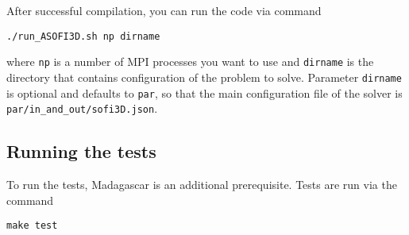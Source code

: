 After successful compilation, you can run the code via command

\begin{verbatim}
./run_ASOFI3D.sh np dirname
\end{verbatim}

where \texttt{np} is a number of MPI processes you want to use and
\texttt{dirname} is the directory that contains configuration of the
problem to solve. Parameter \texttt{dirname} is optional and defaults to
\texttt{par}, so that the main configuration file of the solver is
\texttt{par/in\_and\_out/sofi3D.json}.

\subsection{Running the tests}\label{running-the-tests}

To run the tests, Madagascar is an additional prerequisite. Tests are
run via the command

\begin{verbatim}
make test
\end{verbatim}
